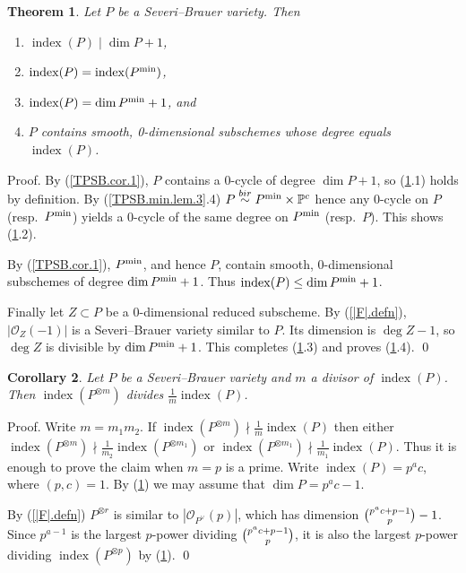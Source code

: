 \documentclass{amsart}
\newtheorem{thm}{Theorem}%
\newtheorem{cor}[thm]{Corollary}
\theoremstyle{definition}
\theoremstyle{remark}
\renewcommand{\o}[0]{{\mathcal O}}
\newcommand{\p}[0]{{\mathbb P}}
\newcommand{\ind}[0]{\operatorname{index}}
\newcommand{\simb}[0]{\stackrel{bir}{\sim}}
\begin{document}
\begin{thm} \label{SB.index.thm}
Let $P$ be  a Severi--Brauer variety. Then
\begin{enumerate}
\item $\ind(P) \mid \dim P+1$, 
\item  $\ind(P)=\ind( P^{\rm min})$,
\item  $\ind(P)=\dim P^{\rm min}+1$, and
\item  $P$ contains  smooth, 0-dimensional subschemes  whose  degree equals  $\ind(P)$.
\end{enumerate} 
\end{thm}


Proof.  By (\ref{TPSB.cor.1}), $P$ contains a 0-cycle of degree $\dim P+1$, so (\ref{SB.index.thm}.1) holds by definition. 
By (\ref{TPSB.min.lem.3}.4) $P\simb P^{\rm min}\times \p^c$
hence any 0-cycle on $P$ (resp.\ $P^{\rm min}$) yields a
0-cycle of the same degree on $P^{\rm min}$ (resp.\ $P$).
This shows (\ref{SB.index.thm}.2).

 By (\ref{TPSB.cor.1}), $P^{\rm min}$, and hence $P$,
contain smooth, $0$-dimensional subschemes  of degree $\dim P^{\rm min}+1$. Thus
$\ind(P)\leq \dim P^{\rm min}+1$.

Finally let $Z\subset P$ be a 0-dimensional reduced subscheme.
By (\ref{|F|.defn}), $|\o_Z(-1)|$ is a Severi--Brauer variety similar to $P$.
Its dimension is $\deg Z-1$, so $\deg Z$ 
 is divisible by
$\dim P^{\rm min}+1$.  This  completes (\ref{SB.index.thm}.3) and proves (\ref{SB.index.thm}.4).  \qed



\begin{cor}\label{index.drops.pow.cor} Let $P$ be a Severi--Brauer variety and $m$ a divisor of $\ind(P)$. Then
$\ind(P^{\otimes m})$ divides  $\tfrac1{m}\ind(P)$.
\end{cor}

Proof. Write $m=m_1m_2$. If $\ind(P^{\otimes m})\nmid \tfrac1{m}\ind(P)$
then either $\ind(P^{\otimes m})\nmid \tfrac1{m_2}\ind(P^{\otimes m_1})$
or $\ind(P^{\otimes m_1})\nmid \tfrac1{m_1}\ind(P)$. Thus it is enough to prove the claim when $m=p$ is a prime. Write $\ind(P)=p^ac$, where $(p,c)=1$. 
By (\ref{SB.index.thm}) we may assume that $\dim P=p^ac-1$.

By (\ref{|F|.defn})  $P^{\otimes r}$ is similar to $|\o_{P^\vee}(p)|$,
which has dimension $\tbinom{p^ac+p-1}{p}-1$.
Since    $p^{a-1}$ is the largest $p$-power dividing $\tbinom{p^ac+p-1}{p}$,
it is also the largest $p$-power dividing
$\ind(P^{\otimes p})$ by (\ref{SB.index.thm}). \qed
\end{document}
